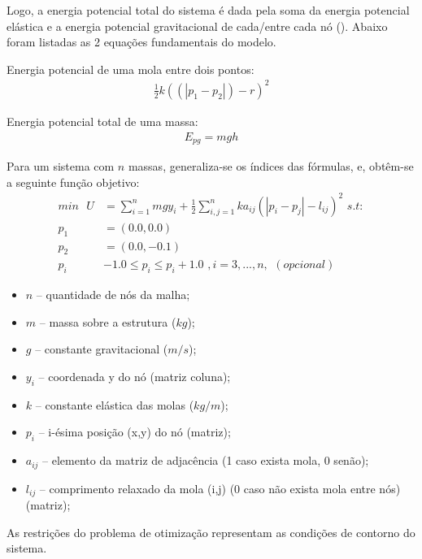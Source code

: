 \documentclass{article}
\begin{document}
Logo, a energia potencial total do sistema é dada pela soma da energia potencial elástica e a energia potencial gravitacional de cada/entre cada nó (\cite{liu2013fast}). Abaixo foram listadas as 2 equações fundamentais do modelo.\newline

Energia potencial de uma mola entre dois pontos:
\begin{equation}
\begin{split}
\frac{1}{2} k( (|p_1 - p_2|) - r)^2
\end{split}
\end{equation}

Energia potencial total de uma massa:
\begin{equation}
\begin{split}
E_{pg} = mgh
\end{split}
\end{equation}



Para um sistema com $n$ massas, generaliza-se os índices das fórmulas, e, obtêm-se a seguinte função objetivo:
\begin{equation}
\begin{split}
min \,\,\,\, U & = \sum_{i=1}^{n} mgy_i + \frac{1}{2} \sum_{i,j=1}^{n} k a_{ij} (|p_i - p_j| - l_{ij})^2 \,\, s.t: \\
p_1 & = (0.0, 0.0) \\
p_2 & = (0.0, -0.1) \\
p_i & - 1.0 \leq p_i \leq p_i + 1.0  \,\, , i = 3, ... , n ,\,\ (opcional)
\end{split}
\end{equation}

\begin{itemize}
\item $n$ -- quantidade de nós da malha;
\item $m$ -- massa sobre a estrutura ($kg$);
\item $g$ -- constante gravitacional ($m/s$);
\item $y_i$ -- coordenada y do nó (matriz coluna);
\item $k$ -- constante elástica das molas ($kg/m$);
\item $p_i$ -- i-ésima posição (x,y) do nó (matriz);
\item $a_{ij}$ -- elemento da matriz de adjacência (1 caso exista mola, 0 senão);
\item $l_{ij}$ -- comprimento relaxado da mola (i,j) (0 caso não exista mola entre nós) (matriz);
\end{itemize}
As restrições do problema de otimização representam as condições de contorno do sistema.
\end{document}
